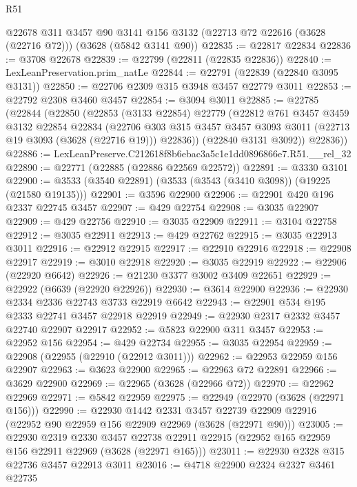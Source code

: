 \begin{lexlean}{R51}
\begin{coremodule}
    @22678
    @311
    @3457
    @90
    @3141
    @156
    @3132
    (@22713 @72 @22616 (@3628 (@22716 @72)))
    (@3628 (@5842 @3141 @90))
@22835 := @22817 @22834
@22836 := @3708 @22678
@22839 := @22799 (@22811 (@22835 @22836))
@22840 := LexLeanPreservation.prim_natLe
@22844 := @22791 (@22839 (@22840 @3095 @3131))
@22850 := @22706 @2309 @315 @3948 @3457 @22779 @3011
@22853 := @22792 @2308 @3460 @3457
@22854 := @3094 @3011
@22885 := @22785
    (@22844
      (@22850
        (@22853
          (@3133 @22854)
          @22779
          (@22812
            @761
            @3457
            @3459
            @3132
            @22854
            @22834
            (@22706
              @303
              @315
              @3457
              @3457
              @3093
              @3011
              (@22713 @19 @3093 (@3628 (@22716 @19)))
              @22836))
          (@22840 @3131 @3092))
        @22836))
@22886 := LexLeanPreserve.C212618f8b6ebac3a5c1e1dd0896866e7.R51.__rel_32
@22890 := @22771 (@22885 (@22886 @22569 @22572))
@22891 := @3330 @3101
@22900 := @3533 (@3540 @22891) (@3533 (@3543 (@3410 @3098)) (@19225 (@21580 @19135)))
@22901 := @3596 @22900
@22906 := @22901 @420 @196 @2337 @22745 @3457
@22907 := @429 @22754
@22908 := @3035 @22907
@22909 := @429 @22756
@22910 := @3035 @22909
@22911 := @3104 @22758
@22912 := @3035 @22911
@22913 := @429 @22762
@22915 := @3035 @22913 @3011
@22916 := @22912 @22915
@22917 := @22910 @22916
@22918 := @22908 @22917
@22919 := @3010 @22918
@22920 := @3035 @22919
@22922 := @22906 (@22920 @6642)
@22926 := @21230 @3377 @3002 @3409 @22651
@22929 := @22922 (@6639 (@22920 @22926))
@22930 := @3614 @22900
@22936 := @22930 @2334 @2336 @22743 @3733 @22919 @6642
@22943 := @22901 @534 @195 @2333 @22741 @3457 @22918 @22919
@22949 := @22930 @2317 @2332 @3457 @22740 @22907 @22917
@22952 := @5823 @22900 @311 @3457
@22953 := @22952 @156
@22954 := @429 @22734
@22955 := @3035 @22954
@22959 := @22908 (@22955 (@22910 (@22912 @3011)))
@22962 := @22953 @22959 @156 @22907
@22963 := @3623 @22900
@22965 := @22963 @72 @22891
@22966 := @3629 @22900
@22969 := @22965 (@3628 (@22966 @72))
@22970 := @22962 @22969
@22971 := @5842 @22959
@22975 := @22949 (@22970 (@3628 (@22971 @156)))
@22990 := @22930
    @1442
    @2331
    @3457
    @22739
    @22909
    @22916
    (@22952 @90 @22959 @156 @22909 @22969 (@3628 (@22971 @90)))
@23005 := @22930
    @2319
    @2330
    @3457
    @22738
    @22911
    @22915
    (@22952 @165 @22959 @156 @22911 @22969 (@3628 (@22971 @165)))
@23011 := @22930 @2328 @315 @22736 @3457 @22913 @3011
@23016 := @4718 @22900 @2324 @2327 @3461 @22735

\end{coremodule}
\end{lexlean}
